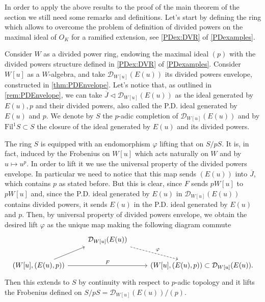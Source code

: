 \noindent
In order to apply the above results to the proof of the main theorem of the section
we still need some remarks and definitions.
Let's start by defining the ring which allows to overcome the problem of
definition of divided powers on the maximal ideal of $O_K$
for a ramified extension, see \cref{PDex:DVR} of \cref{PDexamples}.


\begin{defn}[]
	Consider $W$ as a divided power ring, endowing the maximal ideal $(p)$
	with the divided powers structure defined in \cref{PDex:DVR} of \cref{PDexamples}.
	Consider $W[u]$ as a $W$-algebra, and take $\mathcal{D}_{W[u]}(E(u))$
	its divided powers envelope, constructed in \cref{thm:PDEnvelope}.
	Let's notice that, as outlined in \cref{rem:PDEnvelope},
	we can take $\overline{J} \triangleleft \mathcal{D}_{W[u]}(E(u))$ 
	as the ideal generated by $E(u), p$ and their divided powers,
	also called the P.D. ideal generated by $E(u)$ and $p$.
	We denote by $S$ the $p$-adic completion of $\mathcal{D}_{W[u]}(E(u))$
	and by $\mathrm{Fil}^1 S \subset S$ the closure of the ideal
	generated by $E(u)$ and its divided powers.
\end{defn}


\begin{rem}[]\label{rem:liftFrobeniusS}
	The ring $S$ is equipped with an endomorphism $\varphi$ lifting that on $S/pS$.
	It is, in fact, induced by the Frobenius on $W[u]$ which acts naturally
	on $W$ and by $u \mapsto u^p$.
	In order to lift it we use the universal property of
	the divided powers envelope.
	In particular we need to notice that this map sends $(E(u))$
	into $\overline{J}$, which contains $p$ as stated before.
	But this is clear, since $F$ sends $pW[u]$ to $pW[u]$ and, 
	since the P.D. ideal generated by $E(u)$ in $\mathcal{D}_{W[u]}(E(u))$
	contains divided powers, it sends $E(u)$ in the P.D. ideal
	generated by $E(u)$ and $p$.
	Then, by universal property of divided powers envelope, we obtain the desired 
	lift $\varphi$ as the unique map making the following diagram commute
	\begin{equation*}
	\begin{tikzcd}
		&
		\mathcal{D}_{W[u]}(E(u))
		\arrow[rd, "\varphi", dashrightarrow,
		start anchor=south east] & \\
		\left( W[u], (E(u),p)\right) \arrow[ru, "", rightarrow,
		end anchor=south west] 
		\arrow[rr, "F", rightarrow] & &
		\left( W[u], (E(u),p)\right) \subset
		\mathcal{D}_{W[u]}(E(u)). 
	\end{tikzcd}
	\end{equation*}
	Then this extends to $S$ by continuity with respect to $p$-adic
	topology and it lifts the Frobenius defined on
	$S/pS = \mathcal{D}_{W[u]}(E(u))/ (p)$.
\end{rem}


